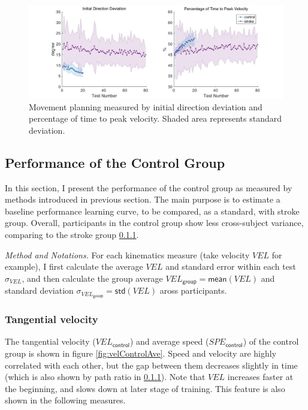 \begin{figure}
	\centering
	\includegraphics[width=0.9\linewidth]{figures/planning}
	\caption[Movement planning measured by initial direction deviation and percentage of time to peak velocity.]{Movement planning measured by initial direction deviation and percentage of time to peak velocity. Shaded area represents standard deviation.}
	\label{fig:planning}
\end{figure}

\subsection{Performance of the Control Group}

In this section, I present the performance of the control group as measured by methods introduced in previous section. The main purpose is to estimate a baseline performance learning curve, to be compared, as a standard, with stroke group. Overall, participants in the control group show less cross-subject variance, comparing to the stroke group \ref{}. 

\textit{Method and Notations.} For each kinematics measure (take velocity $VEL$ for example), I first calculate the average $VEL$ and standard error within each test $\sigma_{VEL}$, and then calculate the group average $VEL_\textsf{group} = \textsf{mean}(VEL)$ and standard deviation $\sigma_{VEL_\textsf{group}} = \textsf{std}(VEL)$ aross participants.

\subsubsection{Tangential velocity}
The tangential velocity ($VEL_\textsf{control}$) and average speed ($SPE_\textsf{control}$) of the control group is shown in figure \ref{fig:velControlAve}. Speed and velocity are highly correlated with each other, but the gap between them decreases slightly in time (which is also shown by path ratio in \ref{}). Note that $VEL$ increases faster at the beginning, and slows down at later stage of training. This feature is also shown in the following measures.


